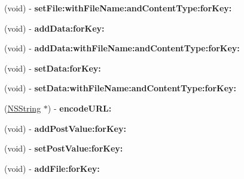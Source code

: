 \begin{DoxyCompactItemize}
\item 
\hypertarget{interface_a_s_i_form_data_request_a1b319de7b302e41e0f2b62b04efd4976}{
(void) -\/ {\bfseries set\-File\-:with\-File\-Name\-:and\-Content\-Type\-:for\-Key\-:}}
\label{interface_a_s_i_form_data_request_a1b319de7b302e41e0f2b62b04efd4976}

\item 
\hypertarget{interface_a_s_i_form_data_request_abeb27ef3dc358d5e0a27ba3a077a6653}{
(void) -\/ {\bfseries add\-Data\-:for\-Key\-:}}
\label{interface_a_s_i_form_data_request_abeb27ef3dc358d5e0a27ba3a077a6653}

\item 
\hypertarget{interface_a_s_i_form_data_request_a8ea88f81e036a80e7e7b7f9af04ac421}{
(void) -\/ {\bfseries add\-Data\-:with\-File\-Name\-:and\-Content\-Type\-:for\-Key\-:}}
\label{interface_a_s_i_form_data_request_a8ea88f81e036a80e7e7b7f9af04ac421}

\item 
\hypertarget{interface_a_s_i_form_data_request_a707a5cef615835146cdbed3ceca31016}{
(void) -\/ {\bfseries set\-Data\-:for\-Key\-:}}
\label{interface_a_s_i_form_data_request_a707a5cef615835146cdbed3ceca31016}

\item 
\hypertarget{interface_a_s_i_form_data_request_abbcca0f83bbe93f0132094a99a274098}{
(void) -\/ {\bfseries set\-Data\-:with\-File\-Name\-:and\-Content\-Type\-:for\-Key\-:}}
\label{interface_a_s_i_form_data_request_abbcca0f83bbe93f0132094a99a274098}

\item 
\hypertarget{interface_a_s_i_form_data_request_ab8c6677cbdb0cd4bf7660b79e5afa334}{
(\hyperlink{class_n_s_string}{\-N\-S\-String} $\ast$) -\/ {\bfseries encode\-U\-R\-L\-:}}
\label{interface_a_s_i_form_data_request_ab8c6677cbdb0cd4bf7660b79e5afa334}

\item 
\hypertarget{interface_a_s_i_form_data_request_af9571a143a9feeb009c33c458447aa98}{
(void) -\/ {\bfseries add\-Post\-Value\-:for\-Key\-:}}
\label{interface_a_s_i_form_data_request_af9571a143a9feeb009c33c458447aa98}

\item 
\hypertarget{interface_a_s_i_form_data_request_a90236e7099afbab72bb160029df5a368}{
(void) -\/ {\bfseries set\-Post\-Value\-:for\-Key\-:}}
\label{interface_a_s_i_form_data_request_a90236e7099afbab72bb160029df5a368}

\item 
\hypertarget{interface_a_s_i_form_data_request_afa340cd3b263a621a4f52015cdb8c568}{
(void) -\/ {\bfseries add\-File\-:for\-Key\-:}}
\label{interface_a_s_i_form_data_request_afa340cd3b263a621a4f52015cdb8c568}


\end{DoxyCompactItemize}
